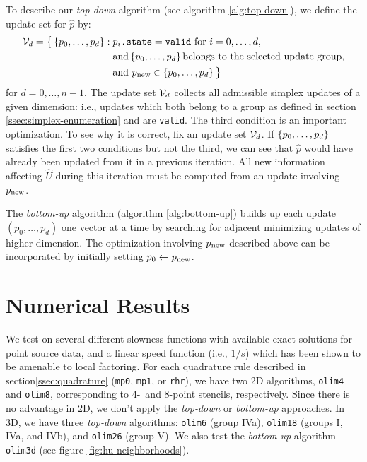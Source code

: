 \documentclass[smallcondensed]{svjour3}
\begin{document}
To describe our \emph{top-down} algorithm (see algorithm
\ref{alg:top-down}), we define the update set for $\hat{p}$ by:
\begin{equation}\label{eq:calU}
  \begin{aligned}
    \mathcal{V}_d = \big\{\left\{p_0, \hdots, p_d\right\}: \; &p_i\texttt{.state}=\texttt{valid} \mbox{ for } i = 0, \hdots, d, \\
    &\mbox{and} \left\{p_0, \hdots, p_d\right\} \mbox{belongs to the selected update group}, \\
    &\mbox{and } p_{\operatorname{new}} \in \left\{p_0, \hdots, p_d\right\} \big\}
  \end{aligned}
\end{equation}
for $d = 0, \hdots, n - 1$. The update set $\mathcal{V}_d$ collects all
admissible simplex updates of a given dimension: i.e., updates which
both belong to a group as defined in section\@
\ref{ssec:simplex-enumeration} and are \texttt{valid}. The third
condition is an important optimization. To see why it is correct, fix
an update set $\mathcal{V}_d$. If $\left\{p_0, \hdots, p_d\right\}$ satisfies the
first two conditions but not the third, we can see that $\hat{p}$
would have already been updated from it in a previous iteration. All
new information affecting $\hat{U}$ during this iteration must be
computed from an update involving $p_{\operatorname{new}}$.

The \emph{bottom-up} algorithm (algorithm \ref{alg:bottom-up}) builds up each
update $(p_0, \hdots, p_d)$ one vector at a time by searching for
adjacent minimizing updates of higher dimension. The optimization
involving $p_{\operatorname{new}}$ described above can be incorporated by initially
setting $p_0 \gets p_{\operatorname{new}}$.

\section{Numerical Results}\label{sec:numerical-results}

We test on several different slowness functions with available exact
solutions for point source data, and a linear speed function (i.e.,
$1/s$) which has been shown to be amenable to local factoring. For
each quadrature rule described in section\@ \ref{ssec:quadrature}
(\texttt{mp0}, \texttt{mp1}, or \texttt{rhr}), we have two 2D
algorithms, \texttt{olim4} and \texttt{olim8}, corresponding to 4-\
and 8-point stencils, respectively. Since there is no advantage in 2D,
we don't apply the \emph{top-down} or \emph{bottom-up} approaches. In
3D, we have three \emph{top-down} algorithms: \texttt{olim6} (group
IVa), \texttt{olim18} (groups I, IVa, and IVb), and \texttt{olim26}
(group V). We also test the \emph{bottom-up} algorithm \texttt{olim3d}
(see figure \ref{fig:hu-neighborhoods}).
\end{document}
